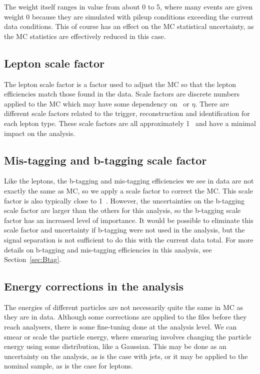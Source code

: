 The weight itself ranges in value from about 0 to 5, where many events are given weight 0 because they are simulated with pileup conditions exceeding the current data conditions.  This of course has an effect on the MC statistical uncertainty, as the MC statistics are effectively reduced in this case.

\subsection{Lepton scale factor}
The lepton scale factor is a factor used to adjust the MC so that the lepton efficiencies match those found in the data.  Scale factors are discrete numbers applied to the MC which may have some dependency on \pt~or $\eta$.  There are different scale factors related to the trigger, reconstruction and identification for each lepton type.  These scale factors are all approximately 1~\cite{Electron, Muon1, Muon2} and have a minimal impact on the analysis.

\subsection{Mis-tagging and b-tagging scale factor}
Like the leptons, the b-tagging and mis-tagging efficiencies we see in data are not exactly the same as MC, so we apply a scale factor to correct the MC.  This scale factor is also typically close to 1~\cite{BTag:CONF, BTag:CONF2}.  However, the uncertainties on the b-tagging scale factor are larger than the others for this analysis, so the b-tagging scale factor has an increased level of importance.  It would be possible to eliminate this scale factor and uncertainty if b-tagging were not used in the analysis, but the signal separation is not sufficient to do this with the current data total.  For more details on b-tagging and mis-tagging efficiencies in this analysis, see Section~\ref{sec:Btag}.

\subsection{Energy corrections in the analysis}\label{sec:energyresolution} 
The energies of different particles are not necessarily quite the same in MC as they are in data.  Although some corrections are applied to the files before they reach analysers, there is some fine-tuning done at the analysis level.  We can smear or scale the particle energy, where smearing involves changing the particle energy using some distribution, like a Gaussian.  This may be done as an uncertainty on the analysis, as is the case with jets, or it may be applied to the nominal sample, as is the case for leptons.  

